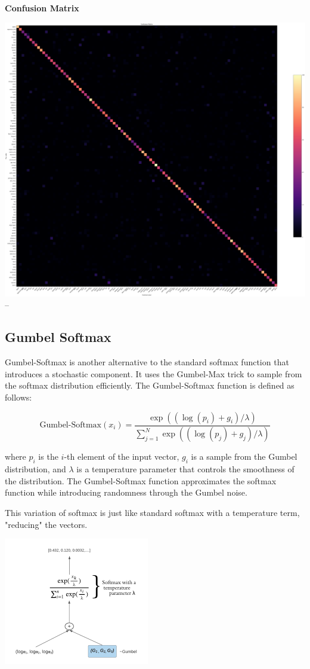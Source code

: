\documentclass{article}
\begin{document}
\textbf{Confusion Matrix}

\includegraphics[width=0.9\linewidth]{images/LogSoftmax/highres-logsoftmax.png}
--

\subsection{Gumbel Softmax}

Gumbel-Softmax\cite{gumbel} is another alternative to the standard softmax function that introduces a stochastic component. It uses the Gumbel-Max trick to sample from the softmax distribution efficiently. The Gumbel-Softmax function is defined as follows:

\[
\text{Gumbel-Softmax}(x_i) = \frac{\exp((\log(p_i) + g_i)/\lambda)}{\sum_{j=1}^{N}\exp((\log(p_j) + g_j)/\lambda)}
\]

where \(p_i\) is the \(i\)-th element of the input vector, \(g_i\) is a sample from the Gumbel distribution, and \(\lambda\) is a temperature parameter that controls the smoothness of the distribution. The Gumbel-Softmax function approximates the softmax function while introducing randomness through the Gumbel noise.

This variation of softmax is just like standard softmax with a temperature term, "reducing" the vectors.

\includegraphics{images/lolgumbelsoftmax.png}
\end{document}
